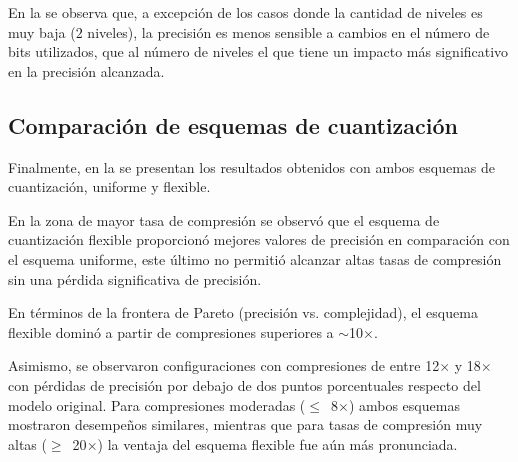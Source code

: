
En la  se observa que, a excepción de los casos donde la cantidad de niveles es muy baja ($2$ niveles), la precisión es menos sensible a cambios en el número de bits utilizados, que al número de niveles el que tiene un impacto más significativo en la precisión alcanzada.

\subsection{Comparación de esquemas de cuantización}

Finalmente, en la  se presentan los resultados obtenidos con ambos esquemas de cuantización, uniforme y flexible.


En la zona de mayor tasa de compresión se observó que el esquema de cuantización flexible proporcionó mejores valores de precisión en comparación con el esquema uniforme, este último no permitió alcanzar altas tasas de compresión sin una pérdida significativa de precisión.

En términos de la frontera de Pareto \cite{pareto1906manuale} (precisión vs. complejidad), el esquema flexible dominó a partir de compresiones superiores a \mbox{$\sim$10$\times$}.

Asimismo, se observaron configuraciones con compresiones de entre 12$\times$ y 18$\times$ con pérdidas de precisión por debajo de dos puntos porcentuales respecto del modelo original. Para compresiones moderadas (\mbox{$\leq$ 8$\times$}) ambos esquemas mostraron desempeños similares, mientras que para tasas de compresión muy altas (\mbox{$\geq$ 20$\times$}) la ventaja del esquema flexible fue aún más pronunciada.
